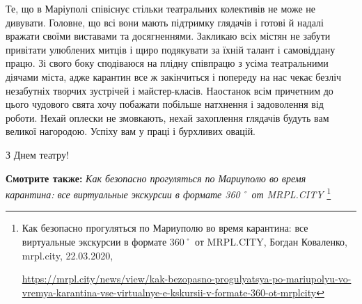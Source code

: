 Те, що в Маріуполі співіснує стільки театральних колективів не може не
дивувати. Головне, що всі вони мають підтримку глядачів і готові й надалі
вражати своїми виставами та досягненнями. Закликаю всіх містян не забути
привітати улюблених митців і щиро подякувати за їхній талант і самовіддану
працю. Зі свого боку сподіваюся на плідну співпрацю з усіма театральними
діячами міста, адже карантин все ж закінчиться і попереду на нас чекає безліч
незабутніх творчих зустрічей і майстер-класів. Наостанок всім причетним до
цього чудового свята хочу побажати побільше натхнення і задоволення від роботи.
Нехай оплески не змовкають, нехай захоплення глядачів будуть вам великої
нагородою. Успіху вам у праці і бурхливих овацій.

З Днем театру!

\textbf{Смотрите также:} \emph{Как безопасно прогуляться по Мариуполю во время карантина: все виртуальные экскурсии в формате 360˚ от MRPL.CITY}%
\footnote{Как безопасно прогуляться по Мариуполю во время карантина: все виртуальные экскурсии в формате 360˚ от MRPL.CITY, Богдан Коваленко, mrpl.city, 22.03.2020, \par%
\url{https://mrpl.city/news/view/kak-bezopasno-progulyatsya-po-mariupolyu-vo-vremya-karantina-vse-virtualnye-e-kskursii-v-formate-360-ot-mrplcity}
 }
